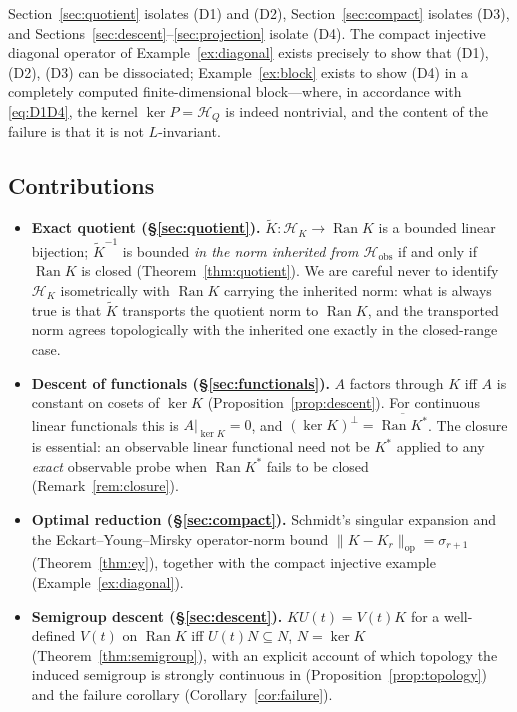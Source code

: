 \documentclass[11pt,reqno]{amsart}
\numberwithin{equation}{section}
\theoremstyle{plain}
\theoremstyle{definition}
\theoremstyle{remark}
\newcommand{\Hobs}{\mathcal{H}_{\mathrm{obs}}}
\newcommand{\HK}{\mathcal{H}_{K}}
\newcommand{\HQ}{\mathcal{H}_{Q}}
\newcommand{\Ran}{\operatorname{Ran}}
\newcommand{\Kt}{\widetilde{K}}
\begin{document}
Section~\ref{sec:quotient} isolates (D1) and (D2), Section~\ref{sec:compact} isolates
(D3), and Sections~\ref{sec:descent}--\ref{sec:projection} isolate (D4). The compact
injective diagonal operator of Example~\ref{ex:diagonal} exists precisely to show that
(D1), (D2), (D3) can be dissociated; Example~\ref{ex:block} exists to show (D4) in a
completely computed finite-dimensional block---where, in accordance with \eqref{eq:D1D4},
the kernel $\ker P=\HQ$ is indeed nontrivial, and the content of the failure is that it is
not $L$-invariant.

\subsection{Contributions}

\begin{itemize}
\item \textbf{Exact quotient (\S\ref{sec:quotient}).} $\Kt:\HK\to\Ran K$ is a bounded
linear bijection; $\Kt^{-1}$ is bounded \emph{in the norm inherited from $\Hobs$} if and
only if $\Ran K$ is closed (Theorem~\ref{thm:quotient}). We are careful never to identify
$\HK$ isometrically with $\Ran K$ carrying the inherited norm: what is always true is that
$\Kt$ transports the quotient norm to $\Ran K$, and the transported norm agrees
topologically with the inherited one exactly in the closed-range case.

\item \textbf{Descent of functionals (\S\ref{sec:functionals}).} $A$ factors through $K$
iff $A$ is constant on cosets of $\ker K$ (Proposition~\ref{prop:descent}). For continuous
linear functionals this is $A|_{\ker K}=0$, and $(\ker K)^{\perp}=\overline{\Ran K^{*}}$.
The closure is essential: an observable linear functional need not be $K^{*}$ applied to
any \emph{exact} observable probe when $\Ran K^{*}$ fails to be closed
(Remark~\ref{rem:closure}).

\item \textbf{Optimal reduction (\S\ref{sec:compact}).} Schmidt's singular expansion and
the Eckart--Young--Mirsky operator-norm bound $\lVert K-K_r\rVert_{\mathrm{op}}=\sigma_{r+1}$
(Theorem~\ref{thm:ey}), together with the compact injective example
(Example~\ref{ex:diagonal}).

\item \textbf{Semigroup descent (\S\ref{sec:descent}).} $KU(t)=V(t)K$ for a well-defined
$V(t)$ on $\Ran K$ iff $U(t)N\subseteq N$, $N=\ker K$ (Theorem~\ref{thm:semigroup}), with
an explicit account of which topology the induced semigroup is strongly continuous in
(Proposition~\ref{prop:topology}) and the failure corollary
(Corollary~\ref{cor:failure}).


\end{itemize}
\end{document}
